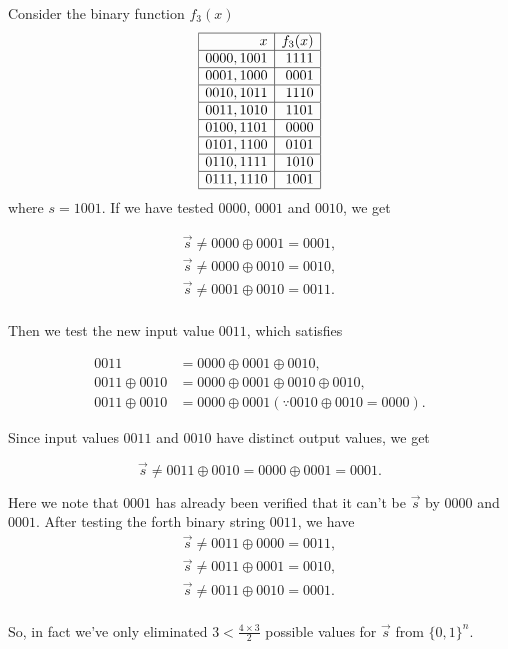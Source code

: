 \begin{example}
Consider the binary function $f_3(x)$
$$
\begin{array}{|r|r|}
	\hline x & f_3(x) \\
	\hline 0000,1001 & 1111 \\
	\hline 0001,1000 & 0001 \\
	\hline 0010,1011 & 1110 \\
	\hline 0011,1010 & 1101 \\
	\hline 0100,1101 & 0000 \\
	\hline 0101,1100 & 0101 \\
	\hline 0110,1111 & 1010 \\
	\hline 0111,1110 & 1001 \\
	\hline
\end{array}
$$
where $s=1001$. If we have tested $0000$, $0001$ and $0010$, we get

$$
\begin{aligned}
	\vec{s} \neq 0000 \oplus 0001 = 0001, \\
	\vec{s} \neq 0000 \oplus 0010 = 0010, \\
	\vec{s} \neq 0001 \oplus 0010 = 0011. \\
\end{aligned}
$$

Then we test the new input value $0011$, which satisfies

$$
\begin{aligned}
0011 &= 0000 \oplus 0001 \oplus 0010,\\
0011 \oplus 0010 &= 0000 \oplus 0001 \oplus0010 \oplus0010 ,\\
0011 \oplus 0010 &= 0000 \oplus 0001 (\because 0010 \oplus 0010 = 0000).
\end{aligned}
$$

Since input values $0011$ and $0010$ have distinct output values, we get 

$$
\vec{s} \neq 0011 \oplus 0010 = 0000 \oplus 0001 = 0001.
$$

Here we note that $0001$ has already been verified that it can't be $\vec{s}$ by $0000$ and $0001$. After testing the forth binary string $0011$, we have
$$
\begin{aligned}
	\vec{s} \neq 0011 \oplus 0000 = 0011, \\
	\vec{s} \neq 0011 \oplus 0001 = 0010, \\
	\vec{s} \neq 0011 \oplus 0010 = 0001. \\
\end{aligned}
$$

So, in fact we've only eliminated $3 < \frac{4 \times 3}{2}$ possible values for $\vec{s}$ from $\{0,1\}^n$.
\end{example}